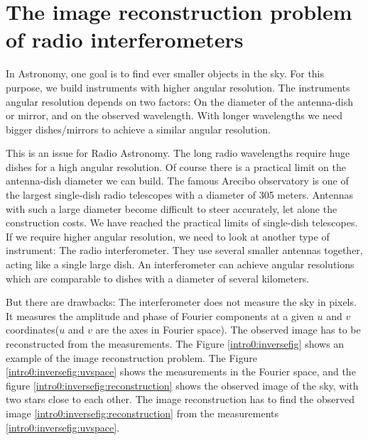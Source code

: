 \section{The image reconstruction problem of radio interferometers}
In Astronomy, one goal is to find ever smaller objects in the sky. For this purpose, we build instruments with higher angular resolution. The instruments angular resolution depends on two factors: On the diameter of the antenna-dish or mirror, and on the observed wavelength. With longer wavelengths we need bigger dishes/mirrors to achieve a similar angular resolution. 

This is an issue for Radio Astronomy. The long radio wavelengths require huge dishes for a high angular resolution. Of course there is a practical limit on the antenna-dish diameter we can build. The famous Arecibo observatory is one of the largest single-dish radio telescopes with a diameter of 305 meters. Antennas with such a large diameter become difficult to steer accurately, let alone the construction costs. We have reached the practical limits of single-dish telescopes. If we require higher angular resolution, we need to look at another type of instrument: The radio interferometer. They use several smaller antennas together, acting like a single large dish. An interferometer can achieve angular resolutions which are comparable to dishes with a diameter of several kilometers.

But there are drawbacks: The interferometer does not measure the sky in pixels. It measures the amplitude and phase of Fourier components at a given $u$ and $v$ coordinates($u$ and $v$ are the axes in Fourier space). The observed image has to be reconstructed from the measurements. The Figure \ref{intro0:inversefig} shows an example of the image reconstruction problem. The Figure \ref{intro0:inversefig:uvspace} shows the measurements in the Fourier space, and the figure \ref{intro0:inversefig:reconstruction} shows the observed image of the sky, with two stars close to each other. The image reconstruction has to find the observed image \ref{intro0:inversefig:reconstruction} from the measurements \ref{intro0:inversefig:uvspace}. 


